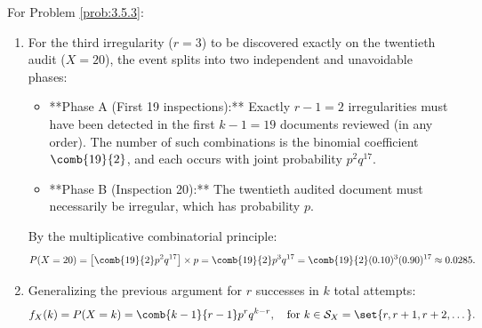 \begin{solucion}
	\label{sol:3.5.3}
	For Problem \ref{prob:3.5.3}:
	\begin{enumerate}
		\item For the third irregularity ($r=3$) to be discovered exactly on the twentieth audit ($X=20$), the event splits into two independent and unavoidable phases:
		\begin{itemize}
			\item **Phase A (First 19 inspections):** Exactly $r-1 = 2$ irregularities must have been detected in the first $k-1 = 19$ documents reviewed (in any order). The number of such combinations is the binomial coefficient $\comb{19}{2}$, and each occurs with joint probability $p^2 q^{17}$.
			\item **Phase B (Inspection 20):** The twentieth audited document must necessarily be irregular, which has probability $p$.
		\end{itemize}
		By the multiplicative combinatorial principle:
		\begin{align*}
			P(X = 20) = \left[\comb{19}{2} p^2 q^{17}\right] \times p = \comb{19}{2} p^3 q^{17} = \comb{19}{2} (0.10)^3 (0.90)^{17} \approx 0.0285.
		\end{align*}
		\item Generalizing the previous argument for $r$ successes in $k$ total attempts:
		\begin{align*}
			f_X(k) = P(X = k) = \comb{k-1}{r-1} p^r q^{k-r}, \quad \text{for } k \in \mathcal{S}_X = \set{r, r+1, r+2, \dots}.
		\end{align*}
	\end{enumerate}
\end{solucion}


